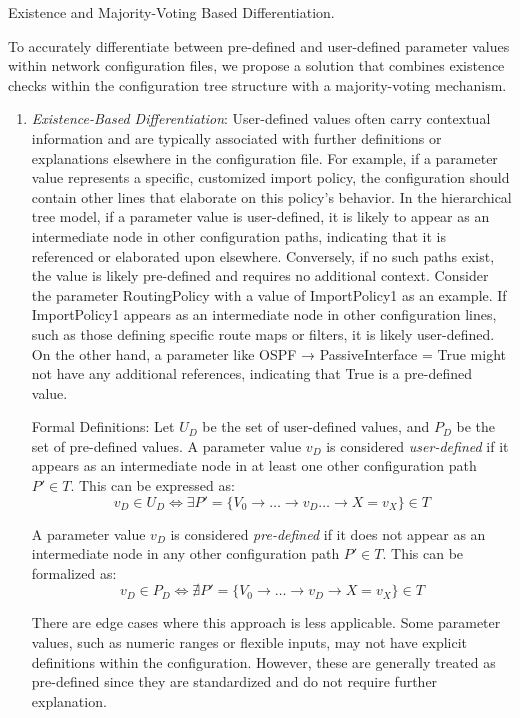  Existence and Majority-Voting Based Differentiation.

To accurately differentiate between pre-defined and user-defined parameter values within network configuration files, we propose a solution that combines existence checks within the configuration tree structure with a majority-voting mechanism.

\begin{enumerate}
    \item \textit{Existence-Based Differentiation}:
User-defined values often carry contextual information and are typically associated with further definitions or explanations elsewhere in the configuration file. For example, if a parameter value represents a specific, customized import policy, the configuration should contain other lines that elaborate on this policy's behavior. In the hierarchical tree model, if a parameter value is user-defined, it is likely to appear as an intermediate node in other configuration paths, indicating that it is referenced or elaborated upon elsewhere. Conversely, if no such paths exist, the value is likely pre-defined and requires no additional context. Consider the parameter RoutingPolicy with a value of ImportPolicy1 as an example. If ImportPolicy1 appears as an intermediate node in other configuration lines, such as those defining specific route maps or filters, it is likely user-defined. On the other hand, a parameter like OSPF → PassiveInterface = True might not have any additional references, indicating that True is a pre-defined value.

Formal Definitions:
Let \( U_D \) be the set of user-defined values, and \( P_D \) be the set of pre-defined values.
A parameter value \( v_D \) is considered \textit{user-defined} if it appears as an intermediate node in at least one other configuration path \( P' \in T \). This can be expressed as:
\[
v_D \in U_D \iff \exists P' = \{ V_0 \rightarrow \dots \rightarrow v_D \dots \rightarrow X = v_X \} \in T
\]

A parameter value \( v_D \) is considered \textit{pre-defined} if it does not appear as an intermediate node in any other configuration path \( P' \in T \). This can be formalized as:
\[
v_D \in P_D \iff \nexists P' = \{ V_0 \rightarrow \dots \rightarrow v_D \rightarrow X = v_X \} \in T
\]


There are edge cases where this approach is less applicable. Some parameter values, such as numeric ranges or flexible inputs, may not have explicit definitions within the configuration. However, these are generally treated as pre-defined since they are standardized and do not require further explanation.



\end{enumerate}
